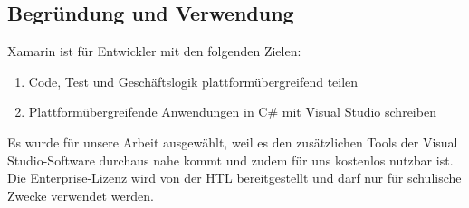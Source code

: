\subsection*{Begründung und Verwendung}
Xamarin ist für Entwickler mit den folgenden Zielen:
\begin{enumerate}
    \item Code, Test und Geschäftslogik plattformübergreifend teilen
    \item Plattformübergreifende Anwendungen in C\# mit Visual Studio schreiben
\end{enumerate}
Es wurde für unsere Arbeit ausgewählt, weil es den zusätzlichen Tools 
der Visual Studio-Software durchaus nahe kommt und zudem für uns kostenlos 
nutzbar ist. Die Enterprise-Lizenz wird von der HTL bereitgestellt und 
darf nur für schulische Zwecke verwendet werden.